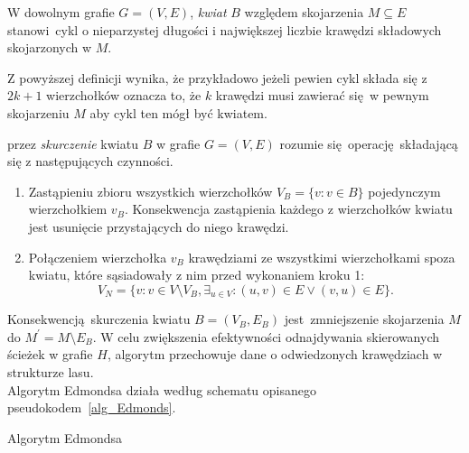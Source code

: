\par{
  \begin{definition}
    W dowolnym grafie $G=(V, E)$, \emph{kwiat} $B$ względem skojarzenia $M \subseteq E$ stanowi cykl o nieparzystej długości i największej liczbie krawędzi składowych skojarzonych w $M$. 
  \end{definition}
  Z powyższej definicji wynika, że przykładowo jeżeli pewien cykl składa się z $2k + 1$ wierzchołków oznacza to, że $k$ krawędzi musi zawierać się w pewnym skojarzeniu $M$ aby cykl ten mógł być kwiatem.
  \begin{definition}
    przez \emph{skurczenie} kwiatu $B$ w grafie $G=(V, E)$ rozumie się operację składającą się z następujących czynności.
    \begin{enumerate}
       \item Zastąpieniu zbioru wszystkich wierzchołków $V_B=\{v: v \in B\}$ pojedynczym wierzchołkiem $v_B$. Konsekwencja zastąpienia każdego z wierzchołków kwiatu jest usunięcie przystających do niego krawędzi.
       \item Połączeniem wierzchołka $v_B$ krawędziami ze wszystkimi wierzchołkami spoza kwiatu, które sąsiadowały z nim przed wykonaniem kroku 1: \[V_N=\{v: v \in V \setminus V_B, \exists_{u \in V}:(u,v)\in E \lor (v, u)\in E\}.\]
     \end{enumerate}
  \end{definition}
  Konsekwencją skurczenia kwiatu $B=(V_B, E_B)$ jest zmniejszenie skojarzenia $M$ do $M^\prime = M \setminus E_B$.
  W celu zwiększenia efektywności odnajdywania skierowanych ścieżek w grafie $H$, algorytm przechowuje dane o odwiedzonych krawędziach w strukturze lasu.\\
  Algorytm Edmondsa działa według schematu opisanego pseudokodem~\ref{alg_Edmonds}.
  \begin{algorithm}
    \caption{Algorytm Edmondsa}\label{alg_Edmonds}
    \begin{algorithmic}[1]




\end{algorithmic}
\end{algorithm}}
